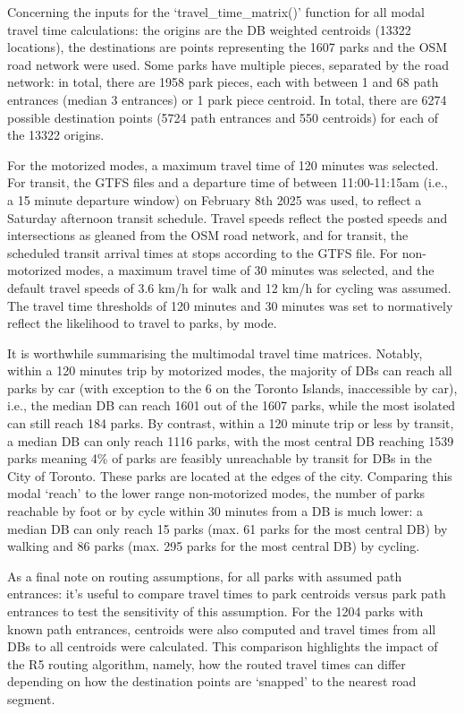 \documentclass[
11pt, %
oneside, %
english, %
singlespacing, %
]{macthesis} %
\begin{document}
Concerning the inputs for the `travel\_time\_matrix()' function for all modal travel time calculations: the origins are the DB weighted centroids (13322 locations), the destinations are points representing the 1607 parks and the OSM road network were used. Some parks have multiple pieces, separated by the road network: in total, there are 1958 park pieces, each with between 1 and 68 path entrances (median 3 entrances) or 1 park piece centroid. In total, there are 6274 possible destination points (5724 path entrances and 550 centroids) for each of the 13322 origins.

For the motorized modes, a maximum travel time of 120 minutes was selected. For transit, the GTFS files and a departure time of between 11:00-11:15am (i.e., a 15 minute departure window) on February 8th 2025 was used, to reflect a Saturday afternoon transit schedule. Travel speeds reflect the posted speeds and intersections as gleaned from the OSM road network, and for transit, the scheduled transit arrival times at stops according to the GTFS file. For non-motorized modes, a maximum travel time of 30 minutes was selected, and the default travel speeds of 3.6 km/h for walk and 12 km/h for cycling was assumed. The travel time thresholds of 120 minutes and 30 minutes was set to normatively reflect the likelihood to travel to parks, by mode.

It is worthwhile summarising the multimodal travel time matrices. Notably, within a 120 minutes trip by motorized modes, the majority of DBs can reach all parks by car (with exception to the 6 on the Toronto Islands, inaccessible by car), i.e., the median DB can reach 1601 out of the 1607 parks, while the most isolated can still reach 184 parks. By contrast, within a 120 minute trip or less by transit, a median DB can only reach 1116 parks, with the most central DB reaching 1539 parks meaning 4\% of parks are feasibly unreachable by transit for DBs in the City of Toronto. These parks are located at the edges of the city. Comparing this modal `reach' to the lower range non-motorized modes, the number of parks reachable by foot or by cycle within 30 minutes from a DB is much lower: a median DB can only reach 15 parks (max. 61 parks for the most central DB) by walking and 86 parks (max. 295 parks for the most central DB) by cycling.

As a final note on routing assumptions, for all parks with assumed path entrances: it's useful to compare travel times to park centroids versus park path entrances to test the sensitivity of this assumption. For the 1204 parks with known path entrances, centroids were also computed and travel times from all DBs to all centroids were calculated. This comparison highlights the impact of the R5 routing algorithm, namely, how the routed travel times can differ depending on how the destination points are `snapped' to the nearest road segment.
\end{document}
